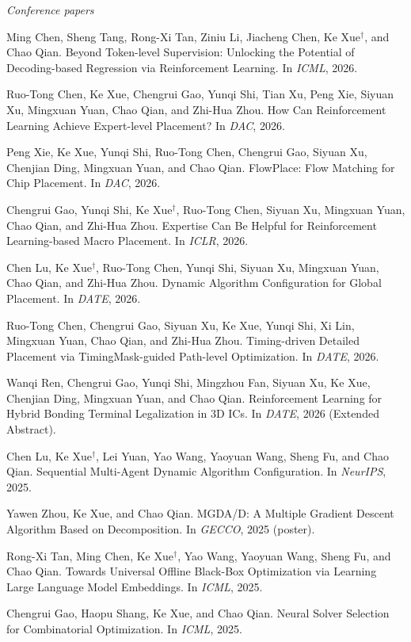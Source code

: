 \documentclass[11pt,a4paper]{article}
\begin{document}
\textit{Conference papers}
\begin{cvbullet}
  \item Ming Chen, Sheng Tang, Rong-Xi Tan, Ziniu Li, Jiacheng Chen, Ke Xue$^\dagger$, and Chao Qian. Beyond Token-level Supervision: Unlocking the Potential of Decoding-based Regression via Reinforcement Learning. In \textit{ICML}, 2026.
  \item Ruo-Tong Chen, Ke Xue, Chengrui Gao, Yunqi Shi, Tian Xu, Peng Xie, Siyuan Xu, Mingxuan Yuan, Chao Qian, and Zhi-Hua Zhou. How Can Reinforcement Learning Achieve Expert-level Placement? In \textit{DAC}, 2026.
  \item Peng Xie, Ke Xue, Yunqi Shi, Ruo-Tong Chen, Chengrui Gao, Siyuan Xu, Chenjian Ding, Mingxuan Yuan, and Chao Qian. FlowPlace: Flow Matching for Chip Placement. In \textit{DAC}, 2026.
  \item Chengrui Gao, Yunqi Shi, Ke Xue$^\dagger$, Ruo-Tong Chen, Siyuan Xu, Mingxuan Yuan, Chao Qian, and Zhi-Hua Zhou. Expertise Can Be Helpful for Reinforcement Learning-based Macro Placement. In \textit{ICLR}, 2026.
  \item Chen Lu, Ke Xue$^\dagger$, Ruo-Tong Chen, Yunqi Shi, Siyuan Xu, Mingxuan Yuan, Chao Qian, and Zhi-Hua Zhou. Dynamic Algorithm Configuration for Global Placement. In \textit{DATE}, 2026.
  \item Ruo-Tong Chen, Chengrui Gao, Siyuan Xu, Ke Xue, Yunqi Shi, Xi Lin, Mingxuan Yuan, Chao Qian, and Zhi-Hua Zhou. Timing-driven Detailed Placement via TimingMask-guided Path-level Optimization. In \textit{DATE}, 2026.
  \item Wanqi Ren, Chengrui Gao, Yunqi Shi, Mingzhou Fan, Siyuan Xu, Ke Xue, Chenjian Ding, Mingxuan Yuan, and Chao Qian. Reinforcement Learning for Hybrid Bonding Terminal Legalization in 3D ICs. In \textit{DATE}, 2026 (Extended Abstract).
  \item Chen Lu, Ke Xue$^\dagger$, Lei Yuan, Yao Wang, Yaoyuan Wang, Sheng Fu, and Chao Qian. Sequential Multi-Agent Dynamic Algorithm Configuration. In \textit{NeurIPS}, 2025.
  \item Yawen Zhou, Ke Xue, and Chao Qian. MGDA/D: A Multiple Gradient Descent Algorithm Based on Decomposition. In \textit{GECCO}, 2025 (poster).
  \item Rong-Xi Tan, Ming Chen, Ke Xue$^\dagger$, Yao Wang, Yaoyuan Wang, Sheng Fu, and Chao Qian. Towards Universal Offline Black-Box Optimization via Learning Large Language Model Embeddings. In \textit{ICML}, 2025.
  \item Chengrui Gao, Haopu Shang, Ke Xue, and Chao Qian. Neural Solver Selection for Combinatorial Optimization. In \textit{ICML}, 2025.

\end{cvbullet}
\end{document}

